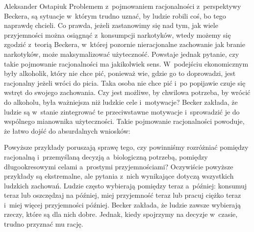 \begin{artplenv}{Aleksander Ostapiuk}
Problemem z~pojmowaniem racjonalności z~perspektywy Beckera, są sytuacje w~którym trudno uznać, by ludzie robili coś, bo
tego naprawdę chcieli. Co prawda, jeżeli zastanowimy się nad tym, jak wiele przyjemności można osiągnąć z~konsumpcji
narkotyków, wtedy możemy się zgodzić z~teorią Beckera, w~której pozornie nieracjonalne zachowanie jak branie
narkotyków, może maksymalizować użyteczność. Powstaje jednak pytanie, czy takie pojmowanie racjonalności ma jakikolwiek
sens. W~podejściu ekonomicznym były alkoholik, który nie chce pić, ponieważ wie, gdzie go to doprowadzi, jest
racjonalny jeżeli wróci do picia. Taka osoba nie chce pić i~po popijawie czuje się wstręt do swojego zachowania. Czy
jest możliwe, by chwilowa potrzeba, by wrócić do alkoholu, była ważniejsza niż ludzkie cele i~motywacje? Becker
zakłada, że ludzie są w~stanie zintegrować te przeciwstawne motywacje i~sprowadzić je do wspólnego mianownika
użyteczności. Takie pojmowanie racjonalności powoduje, że łatwo dojść do absurdalnych wniosków: 


Powyższe przykłady poruszają sprawę tego, czy powinniśmy rozróżniać pomiędzy racjonalną i~przemyślaną
decyzją a~biologiczną potrzebą, pomiędzy długookresowymi celami a~prostymi przyjemnościami? Oczywiście powyższe przykłady są
ekstremalne, ale pytania z~nich wynikające dotyczą wszystkich ludzkich zachowań. Ludzie często wybierają pomiędzy teraz
a~później: konsumuj teraz lub oszczędzaj na później, miej przyjemność teraz lub pracuj ciężko teraz i~miej więcej
przyjemności później. Becker zakłada, że ludzie zawsze wybierają rzeczy, które są dla nich dobre. Jednak, kiedy
spojrzymy na decyzje w~czasie, trudno przyznać mu rację. 


\end{artplenv}
